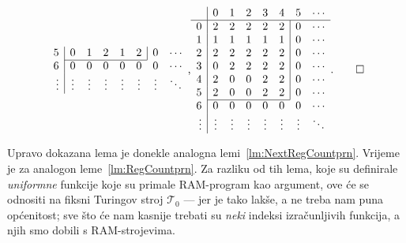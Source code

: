 \begin{primjer}[{name=[kodirana tablica prijelaza]}]
\begin{equation*}
\begin{array}{r|ccccccc}
5& 0 & 1 & 2 & 1 & 2 & \multicolumn{1}{|c}{0} & \cdots\\ \cline{2-6}
6& 0 & 0 & 0 & 0 & 0 & 0 & \cdots\\
\vdots&\vdots&\vdots&\vdots&\vdots&\vdots&\vdots&\ddots
\end{array}\text,
\begin{array}{r|ccccccc}
    &0&1&2&3&4&5&\cdots\\\hline
0& 2 & 2 & 2 & 2 & 2 & \multicolumn{1}{|c}{0} & \cdots\\
1& 1 & 1 & 1 & 1 & 1 & \multicolumn{1}{|c}{0} & \cdots\\
2& 2 & 2 & 2 & 2 & 2 & \multicolumn{1}{|c}{0} & \cdots\\
3& 0 & 2 & 2 & 2 & 2 & \multicolumn{1}{|c}{0} & \cdots\\
4& 2 & 0 & 0 & 2 & 2 & \multicolumn{1}{|c}{0} & \cdots\\
5& 2 & 0 & 0 & 2 & 2 & \multicolumn{1}{|c}{0} & \cdots\\ \cline{2-6}
6& 0 & 0 & 0 & 0 & 0 & 0 & \cdots\\
\vdots&\vdots&\vdots&\vdots&\vdots&\vdots&\vdots&\ddots
\end{array}\text.\qedhere
\end{equation*}
\end{primjer}


Upravo dokazana lema je donekle analogna lemi~\ref{lm:NextRegCountprn}. Vrijeme je za analogon leme~\ref{lm:RegCountprn}. Za razliku od tih lema, koje su definirale \emph{uniformne} funkcije koje su primale RAM-program kao argument, ove će se odnositi na fiksni Turingov stroj $\mathcal T_0$ --- jer je tako lakše, a ne treba nam puna općenitost; sve što će nam kasnije trebati su \emph{neki} indeksi izračunljivih funkcija, a njih smo dobili s RAM-strojevima.


